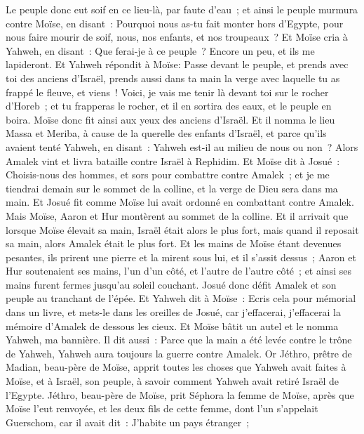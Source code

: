 \begin{multicols}{2}
Le peuple donc eut soif en ce lieu-là, par faute d'eau~; et ainsi le peuple murmura contre Moïse, en disant~: Pourquoi nous as-tu fait monter hors d'Egypte, pour nous faire mourir de soif, nous, nos enfants, et nos troupeaux~?
Et Moïse cria à Yahweh, en disant~: Que ferai-je à ce peuple~? Encore un peu, et ils me lapideront.
Et Yahweh répondit à Moïse: Passe devant le peuple, et prends avec toi des anciens d'Israël, prends aussi dans ta main la verge avec laquelle tu as frappé le fleuve, et viens~!
Voici, je vais me tenir là devant toi sur le rocher d'Horeb~; et tu frapperas le rocher, et il en sortira des eaux, et le peuple en boira. Moïse donc fit ainsi aux yeux des anciens d'Israël.
Et il nomma le lieu Massa et Meriba, à cause de la querelle des enfants d'Israël, et parce qu'ils avaient tenté Yahweh, en disant~: Yahweh est-il au milieu de nous ou non~?
Alors Amalek vint et livra bataille contre Israël à Rephidim.
Et Moïse dit à Josué~: Choisis-nous des hommes, et sors pour combattre contre Amalek~; et je me tiendrai demain sur le sommet de la colline, et la verge de Dieu sera dans ma main.
Et Josué fit comme Moïse lui avait ordonné en combattant contre Amalek. Mais Moïse, Aaron et Hur montèrent au sommet de la colline.
Et il arrivait que lorsque Moïse élevait sa main, Israël était alors le plus fort, mais quand il reposait sa main, alors Amalek était le plus fort.
Et les mains de Moïse étant devenues pesantes, ils prirent une pierre et la mirent sous lui, et il s'assit dessus~; Aaron et Hur soutenaient ses mains, l'un d'un côté, et l'autre de l'autre côté~; et ainsi ses mains furent fermes jusqu'au soleil couchant.
Josué donc défit Amalek et son peuple au tranchant de l'épée.
Et Yahweh dit à Moïse~: Ecris cela pour mémorial dans un livre, et mets-le dans les oreilles de Josué, car j'effacerai, j'effacerai la mémoire d'Amalek de dessous les cieux.
Et Moïse bâtit un autel et le nomma Yahweh, ma bannière.
Il dit aussi~: Parce que la main a été levée contre le trône de Yahweh, Yahweh aura toujours la guerre contre Amalek.
\VerseOne{}Or Jéthro, prêtre de Madian, beau-père de Moïse, apprit toutes les choses que Yahweh avait faites à Moïse, et à Israël, son peuple, à savoir comment Yahweh avait retiré Israël de l'Egypte.
Jéthro, beau-père de Moïse, prit Séphora la femme de Moïse, après que Moïse l'eut renvoyée,
et les deux fils de cette femme, dont l'un s'appelait Guerschom, car il avait dit~: J'habite un pays étranger~;

\end{multicols}
